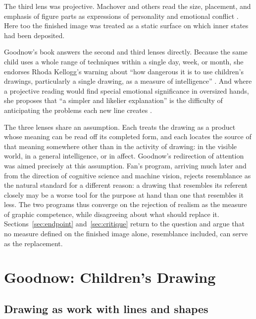 \documentclass[11pt]{article}
\theoremstyle{remark}
\begin{document}
The third lens was projective. Machover and others read the size, placement, and emphasis of figure parts as expressions of personality and emotional conflict \cite{machover1949}. Here too the finished image was treated as a static surface on which inner states had been deposited.

Goodnow's book answers the second and third lenses directly. Because the same child uses a whole range of techniques within a single day, week, or month, she endorses Rhoda Kellogg's warning about ``how dangerous it is to use children's drawings, particularly a single drawing, as a measure of intelligence'' \cite[p.~46]{goodnow1977}. And where a projective reading would find special emotional significance in oversized hands, she proposes that ``a simpler and likelier explanation'' is the difficulty of anticipating the problems each new line creates \cite[p.~48]{goodnow1977}.

The three lenses share an assumption. Each treats the drawing as a product whose meaning can be read off its completed form, and each locates the source of that meaning somewhere other than in the activity of drawing: in the visible world, in a general intelligence, or in affect. Goodnow's redirection of attention was aimed precisely at this assumption. Fan's program, arriving much later and from the direction of cognitive science and machine vision, rejects resemblance as the natural standard for a different reason: a drawing that resembles its referent closely may be a worse tool for the purpose at hand than one that resembles it less. The two programs thus converge on the rejection of realism as the measure of graphic competence, while disagreeing about what should replace it. Sections~\ref{sec:endpoint} and~\ref{sec:critique} return to the question and argue that no measure defined on the finished image alone, resemblance included, can serve as the replacement.

\section{Goodnow: Children's Drawing}
\label{sec:goodnow}

\subsection{Drawing as work with lines and shapes}
\end{document}
